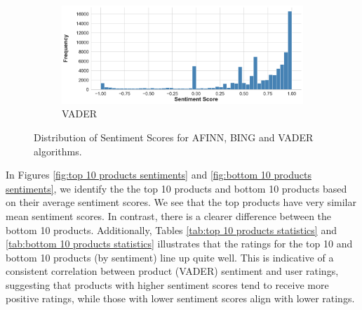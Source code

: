 \begin{figure}[h]
  \hfill
  \begin{subfigure}{0.32\textwidth} %
      \includegraphics[width=\textwidth]{Figures/distribution_vader.pdf} %
      \caption{VADER}
      \label{fig:vader sentiment distribution}
  \end{subfigure}
  \caption{Distribution of Sentiment Scores for AFINN, BING and VADER algorithms.} %
  \label{fig:comparison_sentiments}
\end{figure}

In Figures \ref{fig:top 10 products sentiments} and \ref{fig:bottom 10 products sentiments}, we identify the the top 10 products and bottom 10 products based on their average sentiment scores. We see that the top products have very similar mean sentiment scores. In contrast, there is a clearer difference between the bottom 10 products. Additionally, Tables \ref{tab:top 10 products statistics} and \ref{tab:bottom 10 products statistics} illustrates that the ratings for the top 10 and bottom 10 products (by sentiment) line up quite well. This is indicative of a consistent correlation between product (VADER) sentiment and user ratings, suggesting that products with higher sentiment scores tend to receive more positive ratings, while those with lower sentiment scores align with lower ratings. 

